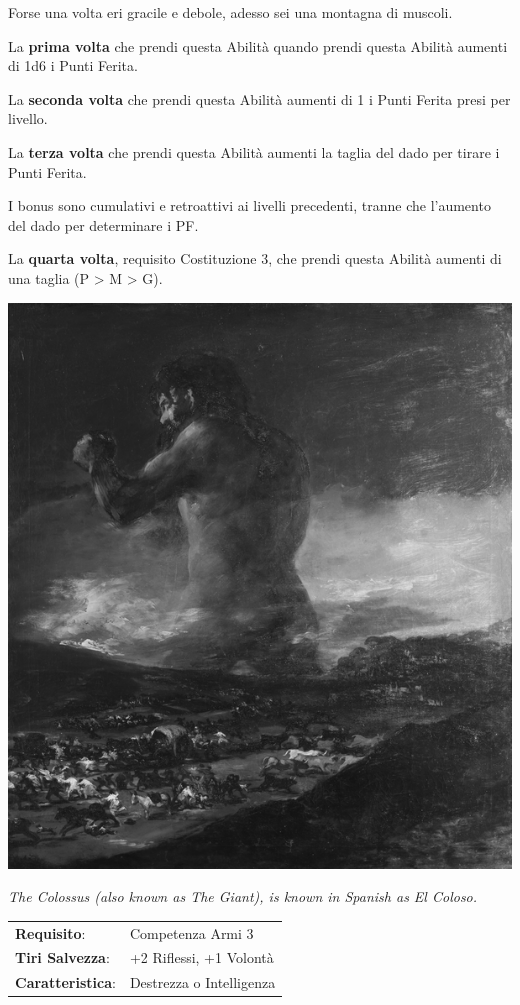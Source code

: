 \begin{multicols}{2}
Forse una volta eri gracile e debole, adesso sei una montagna di muscoli.

La \textbf{prima volta} che prendi questa Abilità quando prendi questa Abilità aumenti di 1d6 i Punti Ferita.

La \textbf{seconda volta} che prendi questa Abilità aumenti di 1 i Punti Ferita presi per livello.

La \textbf{terza volta} che prendi questa Abilità aumenti la taglia del dado per tirare i Punti Ferita.

I bonus sono cumulativi e retroattivi ai livelli precedenti, tranne che l'aumento del dado per determinare i PF.

La \textbf{quarta volta}, requisito Costituzione 3, che prendi questa Abilità aumenti di una taglia (P > M > G).


\begin{center}
	\includegraphics[width=0.65\linewidth]{immagini/elcolosso.png}

	\emph{The Colossus (also known as The Giant), is known in Spanish as El Coloso.}
\end{center}


\noindent\begin{tabularx}{\linewidth}{>{\raggedright\arraybackslash}p{2.5cm}X}
\rowcolor{gray!20}\textbf{Requisito}: & Competenza Armi 3\\
\textbf{Tiri Salvezza}: & +2 Riflessi, +1 Volontà\\
\rowcolor{gray!20}\textbf{Caratteristica}: & Destrezza o Intelligenza\\
\end{tabularx}\smallskip


\end{multicols}

